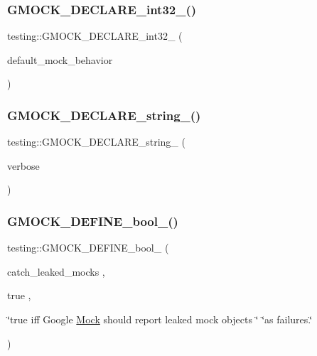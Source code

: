 \mbox{\label{namespacetesting_a8db48e64b7ad3536f6ccf28ce39f9111}} 
\subsubsection{\texorpdfstring{GMOCK\_DECLARE\_int32\_()}{GMOCK\_DECLARE\_int32\_()}}
{\footnotesize\ttfamily testing\+::\+G\+M\+O\+C\+K\+\_\+\+D\+E\+C\+L\+A\+R\+E\+\_\+int32\+\_\+ (\begin{DoxyParamCaption}\item[{default\+\_\+mock\+\_\+behavior}]{ }\end{DoxyParamCaption})}

\mbox{\label{namespacetesting_a4dd099d1d538f26a16fcc2f94011b37e}} 
\subsubsection{\texorpdfstring{GMOCK\_DECLARE\_string\_()}{GMOCK\_DECLARE\_string\_()}}
{\footnotesize\ttfamily testing\+::\+G\+M\+O\+C\+K\+\_\+\+D\+E\+C\+L\+A\+R\+E\+\_\+string\+\_\+ (\begin{DoxyParamCaption}\item[{verbose}]{ }\end{DoxyParamCaption})}

\mbox{\label{namespacetesting_aca5af0e8943ba53352537ab84233b47f}} 
\subsubsection{\texorpdfstring{GMOCK\_DEFINE\_bool\_()}{GMOCK\_DEFINE\_bool\_()}}
{\footnotesize\ttfamily testing\+::\+G\+M\+O\+C\+K\+\_\+\+D\+E\+F\+I\+N\+E\+\_\+bool\+\_\+ (\begin{DoxyParamCaption}\item[{catch\+\_\+leaked\+\_\+mocks}]{,  }\item[{true}]{,  }\item[{\char`\"{}true iff Google \mbox{\hyperlink{classMock}{Mock}} should report leaked mock objects \char`\"{} \char`\"{}as failures.\char`\"{}}]{ }\end{DoxyParamCaption})}

